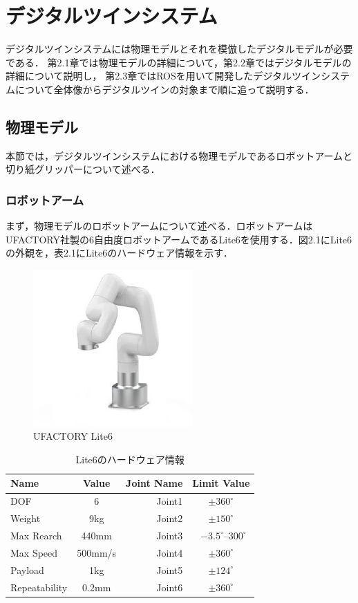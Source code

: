 \chapter{%
デジタルツインシステム}

デジタルツインシステムには物理モデルとそれを模倣したデジタルモデルが必要である．
第2.1章では物理モデルの詳細について，第2.2章ではデジタルモデルの詳細について説明し，
第2.3章ではROSを用いて開発したデジタルツインシステムについて全体像からデジタルツインの対象まで順に追って説明する．


\section{物理モデル}
本節では，デジタルツインシステムにおける物理モデルであるロボットアームと切り紙グリッパーについて述べる．
	
\subsection{ロボットアーム}
まず，物理モデルのロボットアームについて述べる．ロボットアームはUFACTORY社製の6自由度ロボットアームであるLite6を使用する．図2.1にLite6の外観を，表2.1にLite6のハードウェア情報を示す．


\begin{figure}[htbt]
	\centering
	 \includegraphics[height=60mm]{lite6.eps}
	 \caption{UFACTORY Lite6}
	 \label{fig:f2}
\end{figure}

\begin{table}[htb]
	\centering
	\caption{Lite6のハードウェア情報}
	\begin{tabular}{lcrc} \hline
	Name          &Value     &Joint Name&Limit Value     \\ \hline \hline
	DOF           & 6        & Joint1   & $\pm360^\circ$ \\
	Weight        & 9kg      & Joint2   & $\pm150^\circ$ \\
	Max Rearch    & 440mm    & Joint3   & ~$-3.5^\circ$--$300^\circ$ \\
	Max Speed     & 500mm/s  & Joint4   & $\pm360^\circ$ \\
	Payload       & 1kg      & Joint5   & $\pm124^\circ$ \\
	Repeatability & 0.2mm    & Joint6   & $\pm360^\circ$ \\ \hline
	\end{tabular}
\end{table}

